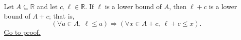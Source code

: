 \begin{proposition}
\label{prop:translation-preserves-lower-bounds}
Let $A\subseteq\mathbb{R}$ and let $c,\ell\in\mathbb{R}$.  If $\ell$ is
a lower bound of $A$, then $\ell+c$ is a lower bound of $A+c$; that is,
\[
\left(\forall a\in A,\ \ell\leq a\right)
\Longrightarrow
\left(\forall x\in A+c,\ \ell+c\leq x\right).
\]
\hyperref[prf:translation-preserves-lower-bounds]{Go to proof.}
\end{proposition}
